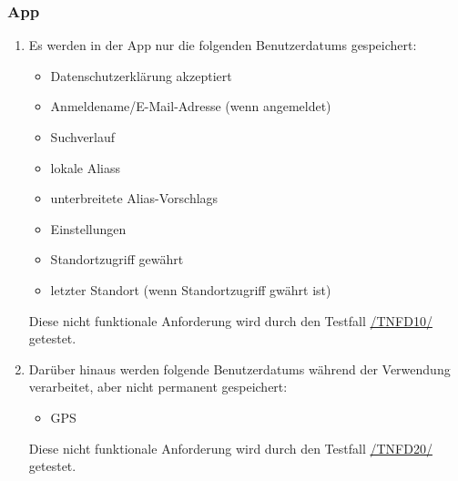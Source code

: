 \subsubsection*{App}

\begin{samepage}
    \begin{enumerate}[label=\textbf{/NFD\arabic*0/}, align=left]
        \item \label{/NFD10/} Es werden in der App nur die folgenden \Glspl{Benutzerdatum} gespeichert:
            \begin{itemize}
                \item Datenschutzerklärung akzeptiert
                \item Anmeldename/E-Mail-Adresse (wenn angemeldet)
                \item Suchverlauf
                \item \gls{lokal}e \Glspl{Alias}
                \item unterbreitete \Glspl{Alias-Vorschlag}
                \item Einstellungen
                \item Standortzugriff gewährt
                \item letzter Standort (wenn Standortzugriff gwährt ist)
            \end{itemize}
            Diese nicht funktionale Anforderung wird durch den Testfall \hyperref[/TNFD10/]{/TNFD10/} getestet.
        \item \label{/NFD20/} Darüber hinaus werden folgende \Glspl{Benutzerdatum} während der Verwendung verarbeitet, aber nicht permanent gespeichert:
            \begin{itemize}
                \item \Gls{GPS}
            \end{itemize}
            Diese nicht funktionale Anforderung wird durch den Testfall \hyperref[/TNFD20/]{/TNFD20/} getestet.
    \end{enumerate}
\end{samepage}
